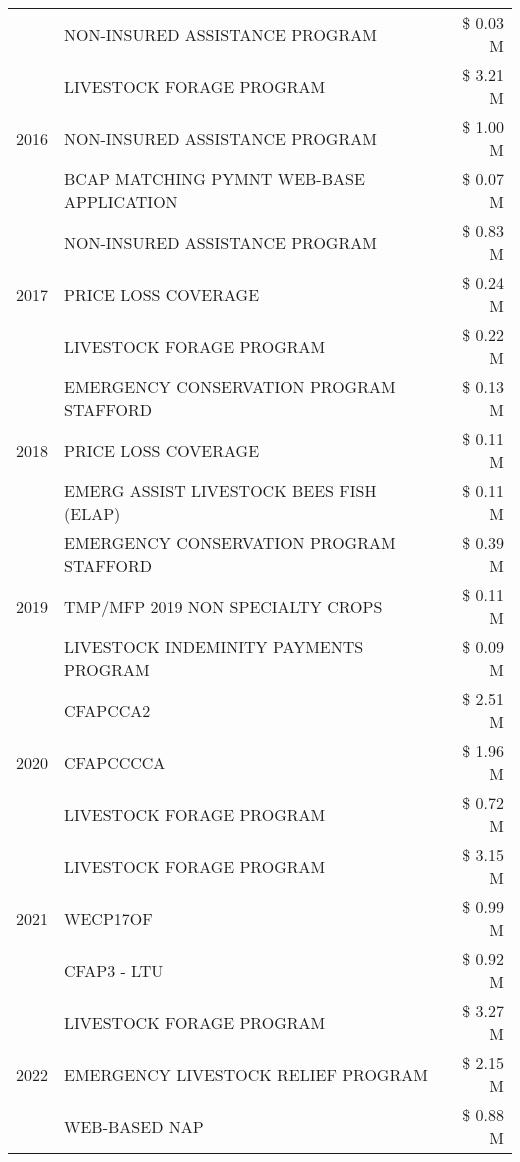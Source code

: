 \begin{tabular}{llr}
 & NON-INSURED ASSISTANCE PROGRAM & \$ 0.03 M \\
\cline{1-3}
\multirow[t]{3}{*}{2016} & LIVESTOCK FORAGE PROGRAM & \$ 3.21 M \\
 & NON-INSURED ASSISTANCE PROGRAM & \$ 1.00 M \\
 & BCAP MATCHING PYMNT WEB-BASE APPLICATION & \$ 0.07 M \\
\cline{1-3}
\multirow[t]{3}{*}{2017} & NON-INSURED ASSISTANCE PROGRAM & \$ 0.83 M \\
 & PRICE LOSS COVERAGE & \$ 0.24 M \\
 & LIVESTOCK FORAGE PROGRAM & \$ 0.22 M \\
\cline{1-3}
\multirow[t]{3}{*}{2018} & EMERGENCY CONSERVATION PROGRAM STAFFORD & \$ 0.13 M \\
 & PRICE LOSS COVERAGE & \$ 0.11 M \\
 & EMERG ASSIST LIVESTOCK BEES FISH (ELAP) & \$ 0.11 M \\
\cline{1-3}
\multirow[t]{3}{*}{2019} & EMERGENCY CONSERVATION PROGRAM STAFFORD & \$ 0.39 M \\
 & TMP/MFP 2019 NON SPECIALTY CROPS & \$ 0.11 M \\
 & LIVESTOCK INDEMINITY PAYMENTS PROGRAM & \$ 0.09 M \\
\cline{1-3}
\multirow[t]{3}{*}{2020} & CFAPCCA2 & \$ 2.51 M \\
 & CFAPCCCCA & \$ 1.96 M \\
 & LIVESTOCK FORAGE PROGRAM & \$ 0.72 M \\
\cline{1-3}
\multirow[t]{3}{*}{2021} & LIVESTOCK FORAGE PROGRAM & \$ 3.15 M \\
 & WECP17OF & \$ 0.99 M \\
 & CFAP3 - LTU & \$ 0.92 M \\
\cline{1-3}
\multirow[t]{3}{*}{2022} & LIVESTOCK FORAGE PROGRAM & \$ 3.27 M \\
 & EMERGENCY LIVESTOCK RELIEF PROGRAM & \$ 2.15 M \\
 & WEB-BASED NAP & \$ 0.88 M \\
\cline{1-3}
\bottomrule
\end{tabular}
